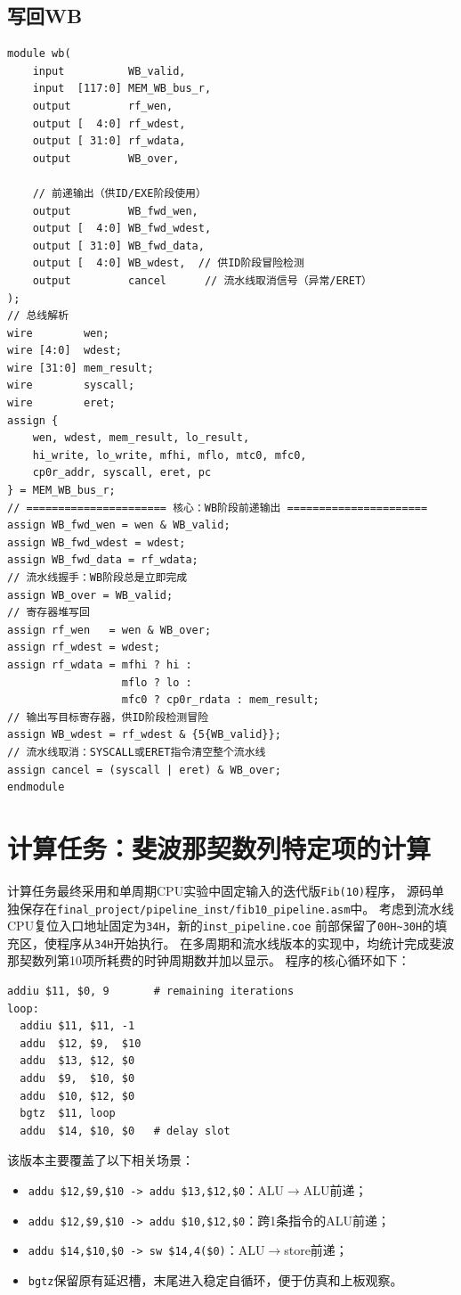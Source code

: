 ﻿\documentclass{article}
\begin{document}
\subsection{写回\textbf{WB}}
\begin{verbatim}
module wb(
    input          WB_valid,
    input  [117:0] MEM_WB_bus_r,
    output         rf_wen,
    output [  4:0] rf_wdest,
    output [ 31:0] rf_wdata,
    output         WB_over,

    // 前递输出（供ID/EXE阶段使用）
    output         WB_fwd_wen,
    output [  4:0] WB_fwd_wdest,
    output [ 31:0] WB_fwd_data,
    output [  4:0] WB_wdest,  // 供ID阶段冒险检测
    output         cancel      // 流水线取消信号（异常/ERET）
);
// 总线解析
wire        wen;
wire [4:0]  wdest;
wire [31:0] mem_result;
wire        syscall;
wire        eret;
assign {
    wen, wdest, mem_result, lo_result,
    hi_write, lo_write, mfhi, mflo, mtc0, mfc0,
    cp0r_addr, syscall, eret, pc
} = MEM_WB_bus_r;
// ====================== 核心：WB阶段前递输出 ======================
assign WB_fwd_wen = wen & WB_valid;
assign WB_fwd_wdest = wdest;
assign WB_fwd_data = rf_wdata;
// 流水线握手：WB阶段总是立即完成
assign WB_over = WB_valid;
// 寄存器堆写回
assign rf_wen   = wen & WB_over;
assign rf_wdest = wdest;
assign rf_wdata = mfhi ? hi :
                  mflo ? lo :
                  mfc0 ? cp0r_rdata : mem_result;
// 输出写目标寄存器，供ID阶段检测冒险
assign WB_wdest = rf_wdest & {5{WB_valid}};
// 流水线取消：SYSCALL或ERET指令清空整个流水线
assign cancel = (syscall | eret) & WB_over;
endmodule
\end{verbatim}

\section{计算任务：斐波那契数列特定项的计算}
计算任务最终采用和单周期CPU实验中固定输入的迭代版\texttt{Fib(10)}程序，
源码单独保存在\texttt{final\_project/pipeline\_inst/fib10\_pipeline.asm}中。
考虑到流水线CPU复位入口地址固定为\texttt{34H}，新的\texttt{inst\_pipeline.coe}
前部保留了\texttt{00H\textasciitilde30H}的填充区，使程序从\texttt{34H}开始执行。
在多周期和流水线版本的实现中，均统计完成斐波那契数列第10项所耗费的时钟周期数并加以显示。
程序的核心循环如下：
\begin{verbatim}
addiu $11, $0, 9       # remaining iterations
loop:
  addiu $11, $11, -1
  addu  $12, $9,  $10
  addu  $13, $12, $0
  addu  $9,  $10, $0
  addu  $10, $12, $0
  bgtz  $11, loop
  addu  $14, $10, $0   # delay slot
\end{verbatim}
该版本主要覆盖了以下相关场景：
\begin{itemize}
  \item \texttt{addu \$12,\$9,\$10 -> addu \$13,\$12,\$0}：ALU$\rightarrow$ALU前递；
  \item \texttt{addu \$12,\$9,\$10 -> addu \$10,\$12,\$0}：跨1条指令的ALU前递；
  \item \texttt{addu \$14,\$10,\$0 -> sw \$14,4(\$0)}：ALU$\rightarrow$store前递；
  \item \texttt{bgtz}保留原有延迟槽，末尾进入稳定自循环，便于仿真和上板观察。
\end{itemize}
\end{document}
